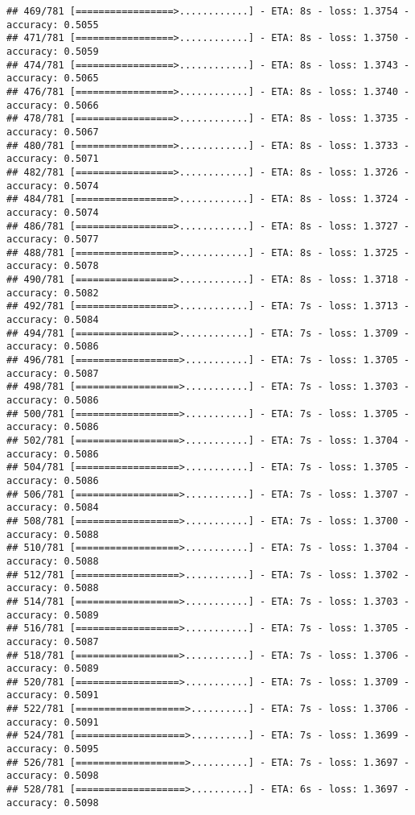 \documentclass[
]{article}
\begin{document}
\begin{verbatim}
## 469/781 [=================>............] - ETA: 8s - loss: 1.3754 - accuracy: 0.5055
## 471/781 [=================>............] - ETA: 8s - loss: 1.3750 - accuracy: 0.5059
## 474/781 [=================>............] - ETA: 8s - loss: 1.3743 - accuracy: 0.5065
## 476/781 [=================>............] - ETA: 8s - loss: 1.3740 - accuracy: 0.5066
## 478/781 [=================>............] - ETA: 8s - loss: 1.3735 - accuracy: 0.5067
## 480/781 [=================>............] - ETA: 8s - loss: 1.3733 - accuracy: 0.5071
## 482/781 [=================>............] - ETA: 8s - loss: 1.3726 - accuracy: 0.5074
## 484/781 [=================>............] - ETA: 8s - loss: 1.3724 - accuracy: 0.5074
## 486/781 [=================>............] - ETA: 8s - loss: 1.3727 - accuracy: 0.5077
## 488/781 [=================>............] - ETA: 8s - loss: 1.3725 - accuracy: 0.5078
## 490/781 [=================>............] - ETA: 8s - loss: 1.3718 - accuracy: 0.5082
## 492/781 [=================>............] - ETA: 7s - loss: 1.3713 - accuracy: 0.5084
## 494/781 [=================>............] - ETA: 7s - loss: 1.3709 - accuracy: 0.5086
## 496/781 [==================>...........] - ETA: 7s - loss: 1.3705 - accuracy: 0.5087
## 498/781 [==================>...........] - ETA: 7s - loss: 1.3703 - accuracy: 0.5086
## 500/781 [==================>...........] - ETA: 7s - loss: 1.3705 - accuracy: 0.5086
## 502/781 [==================>...........] - ETA: 7s - loss: 1.3704 - accuracy: 0.5086
## 504/781 [==================>...........] - ETA: 7s - loss: 1.3705 - accuracy: 0.5086
## 506/781 [==================>...........] - ETA: 7s - loss: 1.3707 - accuracy: 0.5084
## 508/781 [==================>...........] - ETA: 7s - loss: 1.3700 - accuracy: 0.5088
## 510/781 [==================>...........] - ETA: 7s - loss: 1.3704 - accuracy: 0.5088
## 512/781 [==================>...........] - ETA: 7s - loss: 1.3702 - accuracy: 0.5088
## 514/781 [==================>...........] - ETA: 7s - loss: 1.3703 - accuracy: 0.5089
## 516/781 [==================>...........] - ETA: 7s - loss: 1.3705 - accuracy: 0.5087
## 518/781 [==================>...........] - ETA: 7s - loss: 1.3706 - accuracy: 0.5089
## 520/781 [==================>...........] - ETA: 7s - loss: 1.3709 - accuracy: 0.5091
## 522/781 [===================>..........] - ETA: 7s - loss: 1.3706 - accuracy: 0.5091
## 524/781 [===================>..........] - ETA: 7s - loss: 1.3699 - accuracy: 0.5095
## 526/781 [===================>..........] - ETA: 7s - loss: 1.3697 - accuracy: 0.5098
## 528/781 [===================>..........] - ETA: 6s - loss: 1.3697 - accuracy: 0.5098

\end{verbatim}
\end{document}
